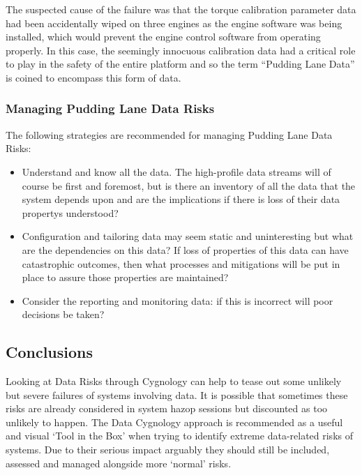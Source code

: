 The suspected cause of the failure was that the torque calibration parameter data had been
accidentally wiped on three engines as the engine software was being installed,
which would prevent the engine control software from operating properly.
In this case, the seemingly innocuous calibration data had a critical role to play in the
safety of the entire platform and so the term “Pudding Lane Data” is coined to encompass
this form of data.

\subsubsection{Managing Pudding Lane Data Risks}
The following strategies are recommended for managing Pudding Lane Data Risks:
\begin{itemize}
\item Understand and know all the data.
The high-profile data streams will of course be first and foremost, but is there an inventory of
all the data that the system depends upon and are the implications if there is loss of their \glspl{data property} understood? 
\item Configuration and tailoring data may seem static and uninteresting but what are the
dependencies on this data?
If loss of properties of this data can have catastrophic outcomes,
then what processes and mitigations will be put in place to assure those properties are maintained?
\item Consider the reporting and monitoring data: if this is incorrect will poor decisions be taken?
\end{itemize}

\subsection{Conclusions}
Looking at Data Risks through Cygnology can help to tease out some unlikely but severe failures of systems involving data. It is possible that sometimes these risks are already considered in system \gls{hazop} sessions but discounted as too unlikely to happen. The Data Cygnology approach is recommended as a useful and visual ‘Tool in the Box’ when trying to identify extreme data-related risks of systems.
Due to their serious impact arguably they should still be included, assessed and managed alongside more ‘normal’ risks.

